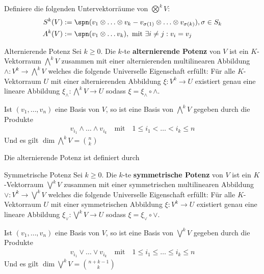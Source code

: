 Definiere die folgenden Untervektorräume von $\bigotimes^kV$:
\begin{align*}
    S^k(V) &:= \spn(v_1 \otimes \ldots \otimes v_k - v_{\sigma(1)} \otimes \ldots \otimes v_{\sigma(k)}), \sigma \in S_k\\
    A^k(V) &:= \spn(v_1 \otimes \ldots v_k), \text{ mit } \exists i\neq j: v_i = v_j
\end{align*}

\begin{definition}{Alternierende Potenz}
    Sei $k \geq 0$. Die $k$-te \textbf{alternierende Potenz} von $V$ ist ein $K$-Vektorraum $\bigwedge^kV$ zusammen mit einer alternierenden multilinearen Abbildung $\wedge: V^k \to \bigwedge^kV$ welches die folgende Universelle Eigenschaft erfüllt:
    Für alle $K$-Vektorraum $U$ mit einer alternierenden Abbildung $\xi: V^k \to U$ existiert genau eine lineare Abbildung $\xi_{\wedge}: \bigwedge^kV \to U$ sodass $\xi = \xi_{\wedge} \circ \wedge$.

    Ist $(v_{1}, \ldots, v_{n})$ eine Basis von $V$, so ist eine Basis von $\bigwedge^kV$ gegeben durch die Produkte
    \begin{align*}
        v_{i_1} \wedge \ldots \wedge v_{i_k} \quad \text{mit} \quad 1 \leq i_{1} < \ldots < i_k \leq n
    \end{align*}
    Und es gilt $\dim \bigwedge^k V = \binom{n}{k}$
\end{definition}

Die alternierende Potenz ist definiert durch
\begin{center}
\end{center}

\begin{definition}{Symmetrische Potenz}
    Sei $k \geq 0$. Die $k$-te \textbf{symmetrische Potenz} von $V$ ist ein $K$-Vektorraum $\bigvee^kV$ zusammen mit einer symmetrischen multilinearen Abbildung $\vee: V^k \to \bigvee^kV$ welches die folgende Universelle Eigenschaft erfüllt:
    Für alle $K$-Vektorraum $U$ mit einer symmetrischen Abbildung $\xi: V^k \to U$ existiert genau eine lineare Abbildung $\xi_{\vee}: \bigvee^kV \to U$ sodass $\xi = \xi_{\vee} \circ \vee$.

    Ist $(v_{1}, \ldots, v_{n})$ eine Basis von $V$, so ist eine Basis von $\bigvee^kV$ gegeben durch die Produkte
    \begin{align*}
        v_{i_1} \vee \ldots \vee v_{i_k} \quad \text{mit} \quad 1 \leq i_{1} \leq \ldots \leq i_k \leq n
    \end{align*}
    Und es gilt $\dim \bigvee^k V = \binom{n+k-1}{k}$
\end{definition}

